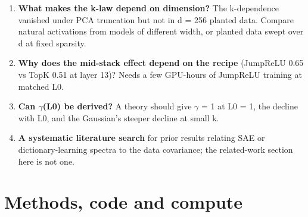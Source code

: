\documentclass[11pt]{article}
\begin{document}
\begin{enumerate}
\item \textbf{What makes the k-law depend on dimension?} The k-dependence vanished under PCA truncation but not in d = 256 planted data. Compare natural activations from models of different width, or planted data swept over d at fixed sparsity.
\item \textbf{Why does the mid-stack effect depend on the recipe} (JumpReLU 0.65 vs TopK 0.51 at layer 13)? Needs a few GPU-hours of JumpReLU training at matched L0.
\item \textbf{Can $\gamma$(L0) be derived?} A theory should give $\gamma$ = 1 at L0 = 1, the decline with L0, and the Gaussian's steeper decline at small k.
\item \textbf{A systematic literature search} for prior results relating SAE or dictionary-learning spectra to the data covariance; the related-work section here is not one.
\end{enumerate}

\section{Methods, code and compute}
\end{document}
